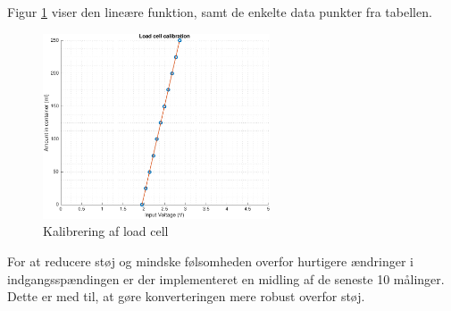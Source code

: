 Figur \ref{fig:loadcellcalib} viser den lineære funktion, samt de enkelte data punkter fra tabellen. 
\begin{figure}[H]
	\centering
	\includegraphics[width=0.6\textwidth]{billeder/software/calibration-crop.pdf}
	\caption{Kalibrering af load cell}
	\label{fig:loadcellcalib}
\end{figure}

For at reducere støj og mindske følsomheden overfor hurtigere ændringer i indgangsspændingen er der implementeret en midling af de seneste 10 målinger. Dette er med til, at gøre konverteringen mere robust overfor støj.  

\newpage
